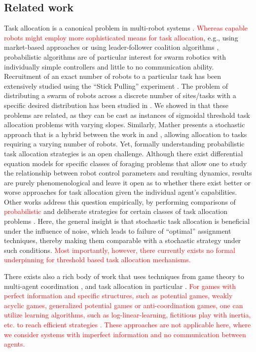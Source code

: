 \documentclass[smallextended]{svjour3}       %
\newcommand{\edit}[1]{\textcolor{red}{#1}}
\begin{document}
\subsection{Related work}
Task allocation is a canonical problem in multi-robot systems \citep{Gerkey2004}. \edit{Whereas capable robots might employ more sophisticated means for task allocation}, e.g., using market-based approaches \citep{Amstutz2008,Vig2007,choi2009consensus} or using  leader-follower coalition algorithms \citep{Chen2011}, probabilistic algorithms are of particular interest for swarm robotics with individually simple controllers \citep{Dantu2012} and little to no communication ability. Recruitment of an exact number of robots to a particular task has been extensively studied using the ``Stick Pulling'' experiment \citep{Lerman2001,Martinoli2004}. The problem of distributing a swarm of robots across a discrete number of sites/tasks with a specific desired distribution has been studied in \citep{Berman2009,Correll2008}. We showed in \citep{Kanakia2014} that these problems are related, as they can be cast as instances of sigmoidal threshold task allocation problems with varying slopes. Similarly, Mather \citep{Mather2010} presents a stochastic approach that is a hybrid between the work in \citep{Berman2009} and \citep{Martinoli2004}, allowing allocation to tasks requiring a varying number of robots. Yet, formally understanding probabilistic task allocation strategies is an open challenge. Although there exist differential equation models for specific classes of foraging problems \citep{lerman2006analysis,liu2010modelling} that allow one to study the relationship between robot control parameters and resulting dynamics, results are purely phenomenological and leave it open as to whether there exist better or worse approaches for task allocation given the individual agent's capabilities. Other works address this question empirically, by performing comparisons of \edit{probabilistic} and deliberate strategies for certain classes of task allocation problems \citep{Kalra2006,correll2007coordination}. Here, the general insight is that stochastic task allocation is beneficial under the influence of noise, which leads to failure of ``optimal'' assignment techniques, thereby making them comparable with a stochastic strategy under such conditions. \edit{Most importantly, however, there currently exists no formal underpinning for threshold based task allocation mechanisms.}

There exists also a rich body of work that uses techniques from game theory to multi-agent coordination \citep{parsons2002game,nisan2007algorithmic}, and task allocation in particular \citep{shehory1998methods}. \edit{For games with perfect information and specific structures, such as potential games, weakly acyclic games, generalized potential games or anti-coordination games, one can utilize learning algorithms, such as log-linear-learning, fictitious play with inertia, etc. to reach efficient strategies \citep{tumer2004survey,arslan2007autonomous,marden2009joint,grenager2002dispersion}. These approaches are not applicable here, where we consider systems with imperfect information and no communication between agents.}  
\end{document}
